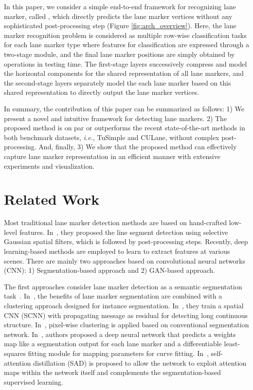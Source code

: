 \documentclass[10pt,twocolumn,letterpaper]{article}
\begin{document}
In this paper, we consider a simple end-to-end framework for recognizing lane marker, called \textit{\algorithmname}, which directly predicts the lane marker vertices without any sophisticated post-processing step (Figure \ref{fig:arch_overview}). Here, the lane marker recognition problem is considered as multiple row-wise classification tasks for each lane marker type where features for classification are expressed through a two-stage module, and the final lane marker positions are simply obtained by  operations in testing time. The first-stage layers successively compress and model the horizontal components for the shared representation of all lane markers, and the second-stage layers separately model the each lane marker based on this shared representation to directly output the lane marker vertices.

In summary, the contribution of this paper can be summarized as follows: 1) We present a novel and intuitive framework for detecting lane markers. 2) The proposed method is on par or outperforms the recent state-of-the-art methods in both benchmark datasets, \textit{i.e.}, TuSimple and CULane, without complex post-processing. And, finally, 3) We show that the proposed method can effectively capture lane marker representation in an efficient manner with extensive experiments and visualization.  


\section{Related Work}
\label{sec:Related_Work} 

Most traditional lane marker detection methods are based on hand-crafted low-level features. In~\cite{CV_Lane}, they proposed the line segment detection using selective Gaussian spatial filters, which is followed by post-processing steps. Recently, deep learning-based methods are employed to learn to extract features at various scenes. There are mainly two approaches based on convolutional neural networks (CNN): 1) Segmentation-based approach and 2) GAN-based approach.

The first approaches consider lane marker detection as a semantic segmentation task~\cite{SpatialAsDeep, IV_Instance, Fitting, Clustering, SAD}. In~\cite{IV_Instance},  the benefits of lane marker segmentation are combined with a clustering approach designed for instance segmentation. In~\cite{SpatialAsDeep}, they train a spatial CNN (SCNN) with propagating message as residual for detecting long continuous structure. In~\cite{Clustering}, pixel-wise clustering is applied based on conventional segmentation network. In~\cite{Fitting}, authors proposed a deep neural network that predicts a weights map like a segmentation output for each lane marker and a differentiable least-squares fitting module for mapping parameters for curve fitting. In~\cite{SAD}, self-attention distillation (SAD) is proposed to allow the network to exploit attention maps within the network itself and complements the segmentation-based supervised learning.
\end{document}
